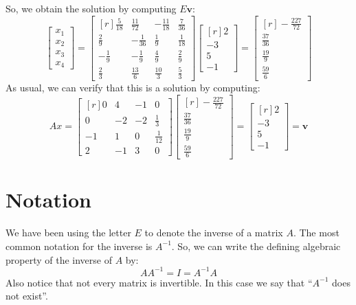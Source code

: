 \documentclass[12pt]{article}
\begin{document}
So, we obtain the solution by computing $E\mathbf{v}$:
\[
\begin{bmatrix}x_1\\x_2\\x_3\\x_4\end{bmatrix}=
\left[\begin{matrix*}[r]\frac{5}{18} & \frac{11}{72} & - \frac{11}{18} & \frac{7}{36}\\\frac{2}{9} & - \frac{1}{36} & \frac{1}{9} & \frac{1}{18}\\- \frac{1}{9} & - \frac{1}{9} & \frac{4}{9} & \frac{2}{9}\\\frac{2}{3} & \frac{13}{6} & \frac{10}{3} & \frac{5}{3}\end{matrix*}\right]
\left[\begin{matrix*}[r]2\\-3\\5\\-1\end{matrix*}\right]=
\left[\begin{matrix*}[r]- \frac{227}{72}\\\frac{37}{36}\\\frac{19}{9}\\\frac{59}{6}\end{matrix*}\right]
\]
As usual, we can verify that this is a solution by computing:
\[
Ax=\left[\begin{matrix*}[r]0 & 4 & -1 & 0\\0 & -2 & -2 & \frac{1}{3}\\-1 & 1 & 0 & \frac{1}{12}\\2 & -1 & 3 & 0\end{matrix*}\right]
\left[\begin{matrix*}[r]- \frac{227}{72}\\\frac{37}{36}\\\frac{19}{9}\\\frac{59}{6}\end{matrix*}\right]=
\left[\begin{matrix*}[r]2\\-3\\5\\-1\end{matrix*}\right]=\mathbf{v}
\]

\section{Notation}
We have been using the letter $E$ to denote the inverse of a matrix $A$. The most common notation for the inverse is $A^{-1}$. So, we can write the defining algebraic property of the inverse of $A$ by:
\[
AA^{-1}=I=A^{-1}A
\]
Also notice that not every matrix is invertible. In this case we say that ``$A^{-1}$ does not exist''.
\end{document}
